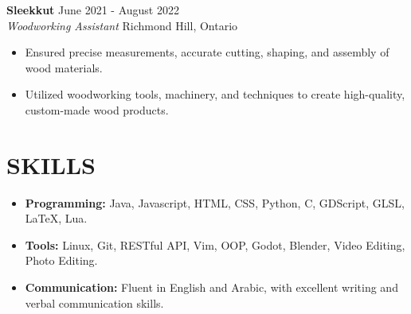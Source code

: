 \documentclass[a4paper,10pt]{extarticle}
\begin{document}
\noindent
\textbf{Sleekkut} \hfill June 2021 - August 2022\\
\textit{Woodworking Assistant} \hfill Richmond Hill, Ontario
\begin{itemize}
	\item Ensured precise measurements, accurate cutting, shaping, and assembly of wood materials.
	\item Utilized woodworking tools, machinery, and techniques to create high-quality, custom-made wood products.
\end{itemize}


\section*{SKILLS}
\begin{itemize}
	\item \textbf{Programming:} Java, Javascript, HTML, CSS, Python, C, GDScript, GLSL, LaTeX, Lua.
	\item \textbf{Tools:} Linux, Git, RESTful API, Vim, OOP, Godot, Blender, Video Editing, Photo Editing.
	\item \textbf{Communication:} Fluent in English and Arabic, with excellent writing and verbal communication skills.
\end{itemize}
\end{document}
